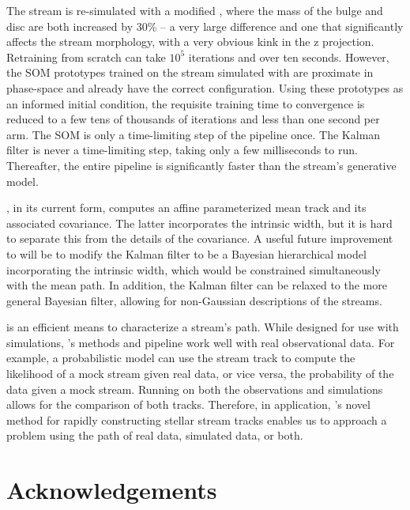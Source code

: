 \documentclass[fleqn,usenatbib]{mnras}
\begin{document}
    The stream is re-simulated with a modified \galpyMWPotential, where the mass
    of the bulge and disc are both increased by 30\% -- a very large difference
    and one that significantly affects the stream morphology, with a very
    obvious kink in the z projection. Retraining from scratch can take $10^5$
    iterations and over ten seconds. However, the SOM prototypes trained on the
    stream simulated with \galpyMWPotential{} are proximate in phase-space and
    already have the correct configuration. Using these prototypes as an
    informed initial condition, the requisite training time to convergence is
    reduced to a few tens of thousands of iterations and less than one second
    per arm. The SOM is only a time-limiting step of the \trackstream{} pipeline
    once. The Kalman filter is never a time-limiting step, taking only a few
    milliseconds to run. Thereafter, the entire pipeline is significantly faster
    than the stream's generative model.

    \trackstream{}, in its current form, computes an affine parameterized mean
    track and its associated covariance. The latter incorporates the intrinsic
    width, but it is hard to separate this from the details of the covariance. A
    useful future improvement to \trackstream{} will be to modify the Kalman
    filter to be a Bayesian hierarchical model incorporating the intrinsic
    width, which would be constrained simultaneously with the mean path. In
    addition, the Kalman filter can be relaxed to the more general Bayesian
    filter, allowing for non-Gaussian descriptions of the streams.

    \trackstream{} is an efficient means to characterize a stream's path. While
    designed for use with simulations, \trackstream{}'s methods and pipeline
    work well with real observational data. For example, a probabilistic model
    can use the stream track to compute the likelihood of a mock stream given
    real data, or vice versa, the probability of the data given a mock stream.
    Running \trackstream{} on both the observations and simulations allows for
    the comparison of both tracks. Therefore, in application, \trackstream's
    novel method for rapidly constructing stellar stream tracks enables us to
    approach a problem using the path of real data, simulated data, or both.





\section*{Acknowledgements} \label{sec:acknowledgements}
\end{document}
